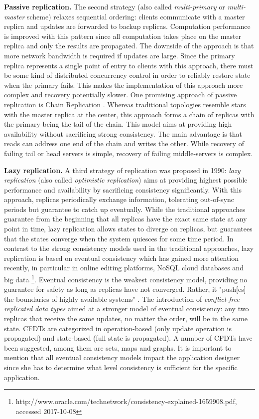 \textbf{Passive replication.} The second strategy (also called \textit{multi-primary} or \textit{multi-master} scheme) relaxes sequential ordering: clients communicate with a master replica and updates are forwarded to backup replicas. Computation performance is improved with this pattern since all computation takes place on the master replica and only the results are propagated. The downside of the approach is that more network bandwidth is required if updates are large. Since the primary replica represents a single point of entry to clients with this approach, there must be some kind of distributed concurrency control in order to reliably restore state when the primary fails. This makes the implementation of this approach more complex and recovery potentially slower. One promising approach of passive replication is Chain Replication \cite{VanRenesse:2004}. Whereas traditional topologies resemble stars with the master replica at the center, this approach forms a chain of replicas with the primary being the tail of the chain. This model aims at providing high availability without sacrificing strong consistency. The main advantage is that reads can address one end of the chain and writes the other. While recovery of failing tail or head servers is simple, recovery of failing middle-servers is complex.

\textbf{Lazy replication.} A third strategy of replication was proposed in 1990: \textit{lazy replication} \cite{Ladin:1990,Ladin:1992} (also called \textit{optimistic replication}) aims at providing highest possible performance and availability by sacrificing consistency significantly. With this approach, replicas periodically exchange information, tolerating out-of-sync periods but guarantee to catch up eventually. While the traditional approaches guarantee from the beginning that all replicas have the exact same state at any point in time, lazy replication allows states to diverge on replicas, but guarantees that the states converge when the system quiesces for some time period. In contrast to the strong consistency models used in the traditional approaches, lazy replication is based on eventual consistency which has gained more attention recently, in particular in online editing platforms, NoSQL cloud databases and big data \footnote{http://www.oracle.com/technetwork/consistency-explained-1659908.pdf, accessed 2017-10-08}. Eventual consistency is the weakest consistency model, providing no guarantee for safety as long as replicas have not converged. Rather, it "push[es] the boundaries of highly available systems" \cite{Bailis:2013}. The introduction of \textit{conflict-free replicated data types} \cite{Shapiro:2011} aimed at a stronger model of eventual consistency: any two replicas that receive the same updates, no matter the order, will be in the same state. CFDTs are categorized in operation-based (only update operation is propagated) and state-based (full state is propagated). A number of CFDTs have been suggested, among them are sets, maps and graphs. It is important to mention that all eventual consistency models impact the application designer since she has to determine what level consistency is sufficient for the specific application.
